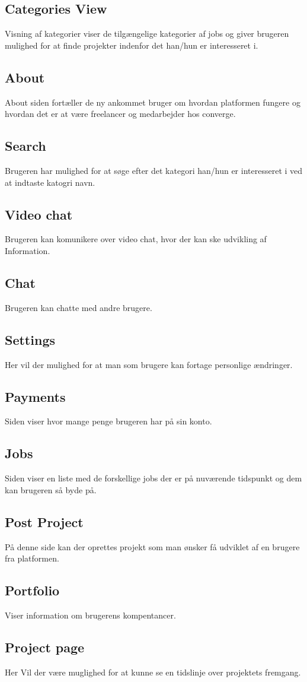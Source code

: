  \subsection{Categories View}
Visning af kategorier viser de tilgængelige kategorier af jobs og giver brugeren mulighed for at finde projekter indenfor det han/hun er interesseret i.

\subsection{About}
 About siden fortæller de ny ankommet bruger om hvordan platformen fungere og hvordan det er at være freelancer og medarbejder hos converge.

 \subsection{Search}
Brugeren har mulighed for at søge efter det kategori han/hun er interesseret i ved at indtaste katogri navn.

\subsection{Video chat}
Brugeren kan komunikere over video chat, hvor der kan ske udvikling af Information.

\subsection{Chat}
Brugeren kan chatte med andre brugere.

\subsection{Settings}
Her vil der mulighed for at man som brugere kan fortage personlige ændringer.
\subsection{Payments}
Siden viser hvor mange penge brugeren har på sin konto.

\subsection{Jobs}
Siden viser en liste med de forskellige jobs der er på nuværende tidspunkt og dem kan brugeren så byde på.
\subsection{Post Project}
På denne side kan der oprettes projekt som man ønsker få udviklet af en brugere fra platformen.
\subsection{Portfolio}
Viser information om brugerens kompentancer.
\subsection{Project page}
Her Vil der være muglighed for at kunne se en tidslinje over projektets fremgang.
